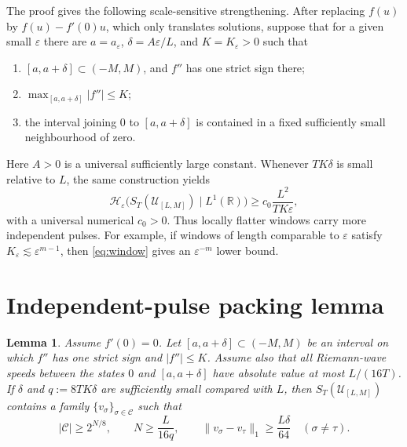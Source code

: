 \documentclass[11pt]{article}
\newtheorem{lemma}{Lemma}
\newcommand{\R}{\mathbb R}
\newcommand{\Hent}{\mathcal H}
\newcommand{\Uclass}{\mathcal U}
\begin{document}
The proof gives the following scale-sensitive strengthening.  After replacing
\(f(u)\) by \(f(u)-f'(0)u\), which only translates solutions, suppose that
for a given small \(\varepsilon\) there are \(a=a_\varepsilon\),
\(\delta=A\varepsilon/L\), and \(K=K_\varepsilon>0\) such that
\begin{enumerate}
\item \([a,a+\delta]\subset(-M,M)\), and \(f''\) has one strict sign there;
\item \(\max_{[a,a+\delta]}|f''|\leq K\);
\item the interval joining \(0\) to \([a,a+\delta]\) is contained in a
fixed sufficiently small neighbourhood of zero.
\end{enumerate}
Here \(A>0\) is a universal sufficiently large constant.  Whenever
\(TK\delta\) is small relative to \(L\), the same construction yields
\begin{equation}\label{eq:window}
 \Hent_\varepsilon\bigl(S_T(\Uclass_{[L,M]})\mid L^1(\R)\bigr)
 \geq c_0\frac{L^2}{TK\varepsilon},
\end{equation}
with a universal numerical \(c_0>0\).  Thus locally flatter windows carry
more independent pulses.  For example, if windows of length comparable to
\(\varepsilon\) satisfy \(K_\varepsilon\lesssim
\varepsilon^{m-1}\), then \eqref{eq:window} gives an
\(\varepsilon^{-m}\) lower bound.

\section*{Independent-pulse packing lemma}

\begin{lemma}\label{lem:pulses}
Assume \(f'(0)=0\).  Let \([a,a+\delta]\subset(-M,M)\) be an interval on
which \(f''\) has one strict sign and \(|f''|\leq K\).  Assume also that all
Riemann-wave speeds between the states \(0\) and \([a,a+\delta]\) have
absolute value at most \(L/(16T)\).  If \(\delta\) and
\(q:=8TK\delta\) are sufficiently small compared with \(L\), then
\(S_T(\Uclass_{[L,M]})\) contains a family \(\{v_\sigma\}_{\sigma\in\mathcal C}\)
such that
\[
 |\mathcal C|\geq 2^{N/8},\qquad
 N\geq \frac{L}{16q},\qquad
 \|v_\sigma-v_\tau\|_1\geq \frac{L\delta}{64}
 \quad(\sigma\ne\tau).
\]
\end{lemma}
\end{document}
